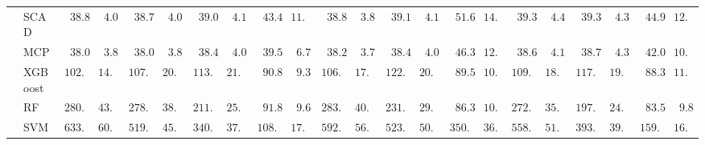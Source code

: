 \begin{tabular}{p{0.2cm}p{1cm}|p{0.6cm}p{0.6cm}|p{0.6cm}p{0.6cm}p{0.6cm}p{0.6cm}p{0.6cm}p{0.6cm}|p{0.6cm}p{0.6cm}p{0.6cm}p{0.6cm}p{0.6cm}p{0.6cm}|p{0.6cm}p{0.6cm}p{0.6cm}p{0.6cm}p{0.6cm}p{0.6cm}}
 & SCAD  & $\phantom{0}38.84$ & $\phantom{0}4.09$ & $\phantom{0}38.73$ & $\phantom{0}4.03$ & $\phantom{0}39.03$ & $\phantom{0}4.11$ & $\phantom{0}43.43$ & $11.82$ & $\phantom{0}38.85$ & $\phantom{0}3.85$ & $\phantom{0}39.19$ & $\phantom{0}4.12$ & $\phantom{0}51.64$ & $14.67$ & $\phantom{0}39.30$ & $\phantom{0}4.40$ & $\phantom{0}39.36$ & $\phantom{0}4.30$ & $\phantom{0}44.96$ & $12.71$ \\
 & MCP  & $\phantom{0}38.04$ & $\phantom{0}3.89$ & $\phantom{0}38.07$ & $\phantom{0}3.81$ & $\phantom{0}38.41$ & $\phantom{0}4.07$ & $\phantom{0}39.57$ & $\phantom{0}6.70$ & $\phantom{0}38.27$ & $\phantom{0}3.79$ & $\phantom{0}38.44$ & $\phantom{0}4.06$ & $\phantom{0}46.32$ & $12.46$ & $\phantom{0}38.63$ & $\phantom{0}4.10$ & $\phantom{0}38.70$ & $\phantom{0}4.33$ & $\phantom{0}42.04$ & $10.80$ \\
 & XGBoost  & $102.38$ & $14.70$ & $107.83$ & $20.20$ & $113.79$ & $21.45$ & $\phantom{0}90.81$ & $\phantom{0}9.34$ & $106.42$ & $17.13$ & $122.32$ & $20.64$ & $\phantom{0}89.52$ & $10.49$ & $109.21$ & $18.04$ & $117.61$ & $19.04$ & $\phantom{0}88.38$ & $11.54$ \\
 & RF  & $280.84$ & $43.37$ & $278.41$ & $38.51$ & $211.28$ & $25.28$ & $\phantom{0}91.89$ & $\phantom{0}9.60$ & $283.70$ & $40.27$ & $231.76$ & $29.52$ & $\phantom{0}86.35$ & $10.76$ & $272.60$ & $35.67$ & $197.82$ & $24.23$ & $\phantom{0}83.58$ & $\phantom{0}9.82$ \\
 & SVM  & $633.86$ & $60.83$ & $519.38$ & $45.68$ & $340.05$ & $37.47$ & $108.60$ & $17.11$ & $592.76$ & $56.91$ & $523.03$ & $50.00$ & $350.50$ & $36.72$ & $558.84$ & $51.50$ & $393.34$ & $39.70$ & $159.33$ & $16.98$ \\
\hline 
\end{tabular}

